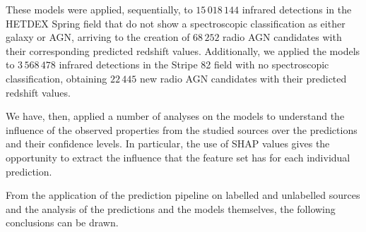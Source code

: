 \documentclass{aa}
\begin{document}
These models were applied, sequentially, to $15\,018\,144$ infrared detections in the HETDEX Spring field that do not show a spectroscopic classification as either galaxy or AGN, arriving to the creation of $68\,252$ radio AGN candidates with their corresponding predicted redshift values. Additionally, we applied the models to $3\,568\,478$ infrared detections in the Stripe 82 field with no spectroscopic classification, obtaining $22\,445$ new radio AGN candidates with their predicted redshift values.

We have, then, applied a number of analyses on the models to understand the influence of the observed properties from the studied sources over the predictions and their confidence levels. In particular, the use of SHAP values gives the opportunity to extract the influence that the feature set has for each individual prediction.

From the application of the prediction pipeline on labelled and unlabelled sources and the analysis of the predictions and the models themselves, the following conclusions can be drawn.
\end{document}
